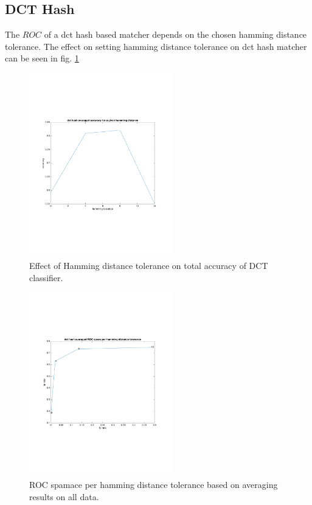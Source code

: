 \documentclass[english,12pt,a4paper,pdftex,elec,utf8]{aaltothesis}
\begin{document}
\subsection{DCT Hash}
The $ROC$ of a dct hash based matcher depends on the chosen hamming distance tolerance. The effect on setting hamming distance tolerance on dct hash matcher can be seen in fig. \ref{dcttotalaccuracy}

\begin{figure}[htb]
\begin{center}
\includegraphics[height=8cm]{figures/dctTotalAccuracy}
\end{center}
\caption{ Effect of Hamming distance tolerance on total accuracy of DCT classifier. }
\label{dcttotalaccuracy}
\end{figure}

\begin{figure}[htb]
\begin{center}
\includegraphics[height=8cm]{figures/dctTotalROC}
\end{center}
\caption{ ROC spamace per hamming distance tolerance based on averaging results on all data. }
\label{dctaverageaccuracy}
\end{figure}
\end{document}
